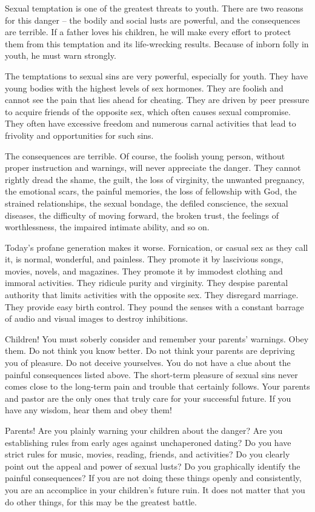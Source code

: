 Sexual temptation is one of the greatest threats to youth. There are two reasons for this danger – the bodily and social lusts are powerful, and the consequences are terrible. If a father loves his children, he will make every effort to protect them from this temptation and its life-wrecking results. Because of inborn folly in youth, he must warn strongly.

The temptations to sexual sins are very powerful, especially for youth. They have young bodies with the highest levels of sex hormones. They are foolish and cannot see the pain that lies ahead for cheating. They are driven by peer pressure to acquire friends of the opposite sex, which often causes sexual compromise. They often have excessive freedom and numerous carnal activities that lead to frivolity and opportunities for such sins.

The consequences are terrible. Of course, the foolish young person, without proper instruction and warnings, will never appreciate the danger. They cannot rightly dread the shame, the guilt, the loss of virginity, the unwanted pregnancy, the emotional scars, the painful memories, the loss of fellowship with God, the strained relationships, the sexual bondage, the defiled conscience, the sexual diseases, the difficulty of moving forward, the broken trust, the feelings of worthlessness, the impaired intimate ability, and so on.

Today’s profane generation makes it worse. Fornication, or casual sex as they call it, is normal, wonderful, and painless. They promote it by lascivious songs, movies, novels, and magazines. They promote it by immodest clothing and immoral activities. They ridicule purity and virginity. They despise parental authority that limits activities with the opposite sex. They disregard marriage. They provide easy birth control. They pound the senses with a constant barrage of audio and visual images to destroy inhibitions.

Children! You must soberly consider and remember your parents’ warnings. Obey them. Do not think you know better. Do not think your parents are depriving you of pleasure. Do not deceive yourselves. You do not have a clue about the painful consequences listed above. The short-term pleasure of sexual sins never comes close to the long-term pain and trouble that certainly follows. Your parents and pastor are the only ones that truly care for your successful future. If you have any wisdom, hear them and obey them!

Parents! Are you plainly warning your children about the danger? Are you establishing rules from early ages against unchaperoned dating? Do you have strict rules for music, movies, reading, friends, and activities? Do you clearly point out the appeal and power of sexual lusts? Do you graphically identify the painful consequences? If you are not doing these things openly and consistently, you are an accomplice in your children’s future ruin. It does not matter that you do other things, for this may be the greatest battle.

